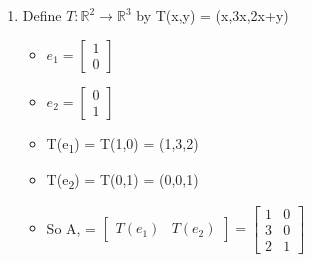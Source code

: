 \documentclass[11pt]{article}
\begin{document}
\begin{enumerate}
\item Define \(T: \mathbb{R}^{2} \rightarrow{} \mathbb{R}^{3}\) by T(x,y) = (x,3x,2x+y)
\begin{itemize}
\item \(e_{1} = \begin{bmatrix}1\\0\end{bmatrix}\)
\item \(e_{2} = \begin{bmatrix}0\\1\end{bmatrix}\)
\item T(e\textsubscript{1}) = T(1,0) = (1,3,2)
\item T(e\textsubscript{2}) = T(0,1) = (0,0,1)
\item So A, = \(\begin{bmatrix}T(e_{1})&T(e_{2})\end{bmatrix} = \begin{bmatrix}1&0\\3&0\\2&1\end{bmatrix}\)
\end{itemize}


\end{enumerate}
\end{document}

